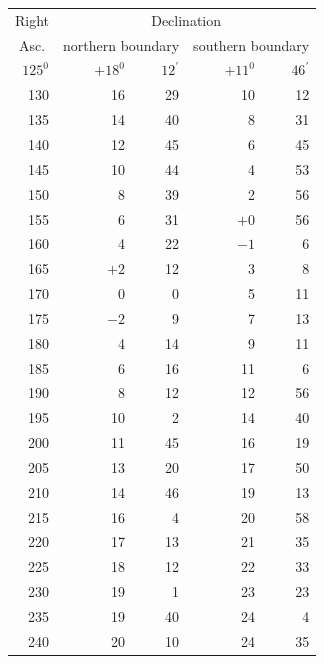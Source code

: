 \begin{center}
\begin{tabular}{|r|r@{\;}r|r@{\;}r|}
\multicolumn{1}{|c|}{Right}&\multicolumn{4}{c|}{Declination}\\
\multicolumn{1}{|c|}{Asc.}&\multicolumn{2}{c|}{northern boundary}&\multicolumn{2}{c|}{southern boundary}\\
\(125^{0}\)&\(+18^{0}\)&\(12^{\prime}\)&\(+11^{0}\)&\(46^{\prime}\)\\
130&16&29&10&12\\
135&14&40&8&31\\
140&12&45&6&45\\
145&10&44&4&53\\
150&8&39&2&56\\
155&6&31&\(+0\)&56\\
160&4&22&\(-1\)&6\\
165&\(+2\)&12&3&8\\
170&0&0&5&11\\
175&\(-2\)&9&7&13\\
180&4&14&9&11\\
185&6&16&11&6\\
190&8&12&12&56\\
195&10&2&14&40\\
200&11&45&16&19\\
205&13&20&17&50\\
210&14&46&19&13\\
215&16&4&20&58\\
220&17&13&21&35\\
225&18&12&22&33\\
230&19&1&23&23\\
235&19&40&24&4\\
240&20&10&24&35\\\hline
\end{tabular}
\end{center}
